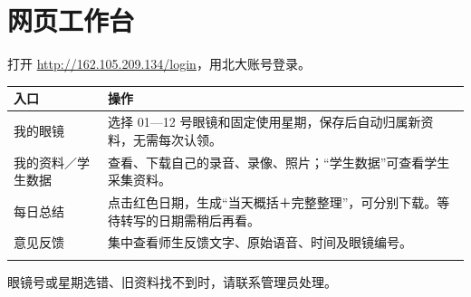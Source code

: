 \documentclass[UTF8,a4paper,10pt]{ctexart}
\begin{document}
\section{网页工作台}
打开 \url{http://162.105.209.134/login}，用北大账号登录。

\begin{tabularx}{\linewidth}{@{}p{3.2cm}Y@{}}
\toprule
\textbf{入口} & \textbf{操作} \\
\midrule
我的眼镜 & 选择 01—12 号眼镜和固定使用星期，保存后自动归属新资料，无需每次认领。 \\ \addlinespace[3pt]
我的资料／学生数据 & 查看、下载自己的录音、录像、照片；“学生数据”可查看学生采集资料。 \\ \addlinespace[3pt]
每日总结 & 点击红色日期，生成“当天概括＋完整整理”，可分别下载。等待转写的日期需稍后再看。 \\ \addlinespace[3pt]
意见反馈 & 集中查看师生反馈文字、原始语音、时间及眼镜编号。 \\ \addlinespace[3pt]
\bottomrule
\end{tabularx}

{\small 眼镜号或星期选错、旧资料找不到时，请联系管理员处理。}
\end{document}

